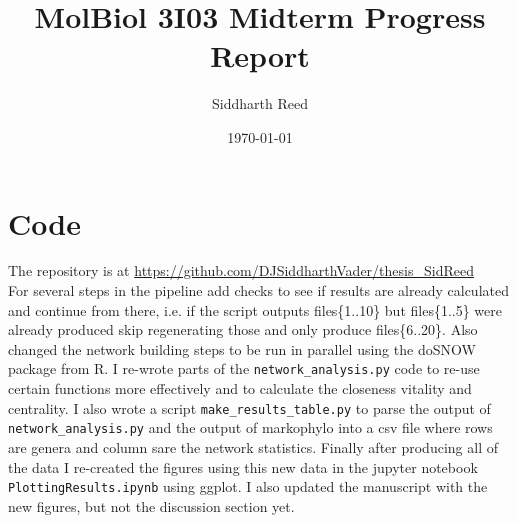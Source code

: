 \documentclass[12pt,letter]{article}
\begin{document}
\title{\vspace{-1in}MolBiol 3I03 Midterm Progress Report}
\author{Siddharth Reed}
\date{\vspace{-0.2in}\today}
\maketitle
\vspace{-0.5in}
\section{Code}
The repository is at \url{https://github.com/DJSiddharthVader/thesis_SidReed}\\
For several steps in the pipeline add checks to see if results are already calculated and continue from there, i.e. if the script outputs files\{1..10\} but files\{1..5\} were already produced skip regenerating those and only produce files\{6..20\}.
Also changed the network building steps to be run in parallel using the doSNOW package from R.
I re-wrote parts of the \verb|network_analysis.py| code to re-use certain functions more effectively and to calculate the closeness vitality and centrality.
I also wrote a script \verb|make_results_table.py| to parse the output of \verb|network_analysis.py| and the output of markophylo into a csv file where rows are genera and column sare the network statistics.
Finally after producing all of the data I re-created the figures using this new data in the jupyter notebook \verb|PlottingResults.ipynb| using ggplot.
I also updated the manuscript with the new figures, but not the discussion section yet.
\end{document}
